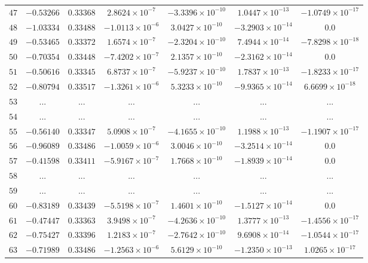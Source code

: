 \begin{landscape}
\begin{center}
\begin{longtable}{lcccccc}
$47$ & $-0.53266$ & $0.33368$ & $2.8624\times{}10^{-7}$ & $-3.3396\times{}10^{-10}$ & $1.0447\times{}10^{-13}$ & $-1.0749\times{}10^{-17}$ \\
$48$ & $-1.03334$ & $0.33488$ & $-1.0113\times{}10^{-6}$ & $3.0427\times{}10^{-10}$ & $-3.2903\times{}10^{-14}$ & $0.0$ \\
$49$ & $-0.53465$ & $0.33372$ & $1.6574\times{}10^{-7}$ & $-2.3204\times{}10^{-10}$ & $7.4944\times{}10^{-14}$ & $-7.8298\times{}10^{-18}$ \\
$50$ & $-0.70354$ & $0.33448$ & $-7.4202\times{}10^{-7}$ & $2.1357\times{}10^{-10}$ & $-2.3162\times{}10^{-14}$ & $0.0$ \\
$51$ & $-0.50616$ & $0.33345$ & $6.8737\times{}10^{-7}$ & $-5.9237\times{}10^{-10}$ & $1.7837\times{}10^{-13}$ & $-1.8233\times{}10^{-17}$ \\
$52$ & $-0.80794$ & $0.33517$ & $-1.3261\times{}10^{-6}$ & $5.3233\times{}10^{-10}$ & $-9.9365\times{}10^{-14}$ & $6.6699\times{}10^{-18}$ \\
$53$ & ... & ... & ... & ... & ... & ... \\
$54$ & ... & ... & ... & ... & ... & ... \\
$55$ & $-0.56140$ & $0.33347$ & $5.0908\times{}10^{-7}$ & $-4.1655\times{}10^{-10}$ & $1.1988\times{}10^{-13}$ & $-1.1907\times{}10^{-17}$ \\
$56$ & $-0.96089$ & $0.33486$ & $-1.0059\times{}10^{-6}$ & $3.0046\times{}10^{-10}$ & $-3.2514\times{}10^{-14}$ & $0.0$ \\
$57$ & $-0.41598$ & $0.33411$ & $-5.9167\times{}10^{-7}$ & $1.7668\times{}10^{-10}$ & $-1.8939\times{}10^{-14}$ & $0.0$ \\
$58$ & ... & ... & ... & ... & ... & ... \\
$59$ & ... & ... & ... & ... & ... & ... \\
$60$ & $-0.83189$ & $0.33439$ & $-5.5198\times{}10^{-7}$ & $1.4601\times{}10^{-10}$ & $-1.5127\times{}10^{-14}$ & $0.0$ \\
$61$ & $-0.47447$ & $0.33363$ & $3.9498\times{}10^{-7}$ & $-4.2636\times{}10^{-10}$ & $1.3777\times{}10^{-13}$ & $-1.4556\times{}10^{-17}$ \\
$62$ & $-0.75427$ & $0.33396$ & $1.2183\times{}10^{-7}$ & $-2.7642\times{}10^{-10}$ & $9.6908\times{}10^{-14}$ & $-1.0544\times{}10^{-17}$ \\
$63$ & $-0.71989$ & $0.33486$ & $-1.2563\times{}10^{-6}$ & $5.6129\times{}10^{-10}$ & $-1.2350\times{}10^{-13}$ & $1.0265\times{}10^{-17}$ \\

\end{longtable}
\end{center}
\end{landscape}
